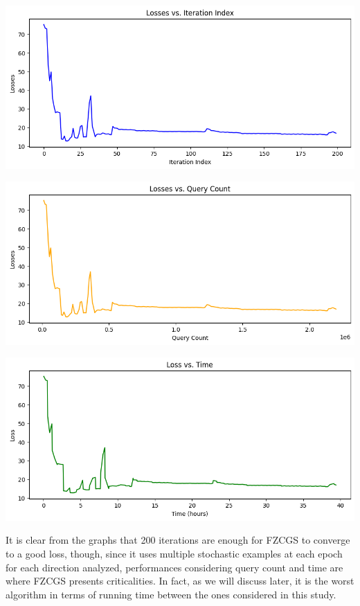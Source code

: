 \documentclass[10pt,twocolumn,letterpaper]{article}
\begin{document}
\begin{center}
   \includegraphics*[scale=0.35]{img/FZCGS_loss_vs_iterations.png}
\end{center}

\begin{center}
   \includegraphics*[scale=0.35]{img/FZCGS_loss_vs_querycount.png}
\end{center}

\begin{center}
   \includegraphics*[scale=0.35]{img/FZCGS_loss_vs_runningtime.png}
\end{center}

It is clear from the graphs that 200 iterations are enough for FZCGS to converge to a good loss,
though, since it uses multiple stochastic examples at each epoch for each direction analyzed, 
performances considering query count and time are where FZCGS presents criticalities.
In fact, as we will discuss later, it is the worst algorithm in terms of running time between the ones
considered in this study. 
\end{document}
